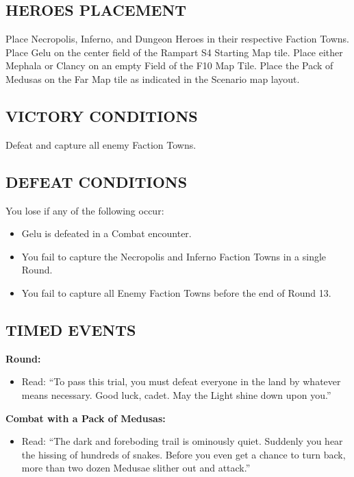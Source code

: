 \begin{multicols*}{2}
\subsection*{\MakeUppercase{Heroes Placement}}

Place Necropolis, Inferno, and Dungeon Heroes in their respective Faction Towns.
Place Gelu on the center field of the Rampart S4 Starting Map tile.
Place either Mephala or Clancy on an empty Field of the F10 Map Tile.
Place the Pack of Medusas on the Far Map tile as indicated in the Scenario map layout.

\subsection*{\MakeUppercase{Victory Conditions}}

Defeat and capture all enemy Faction Towns.

\subsection*{\MakeUppercase{Defeat Conditions}}

You lose if any of the following occur:
\begin{itemize}
  \item Gelu is defeated in a Combat encounter.
  \item You fail to capture the Necropolis and Inferno Faction Towns in a single Round.
  \item You fail to capture all Enemy Faction Towns before the end of Round 13.
\end{itemize}
\subsection*{\MakeUppercase{Timed Events}}

\textbf{ Round:}
\begin{itemize}
  \item Read: ``To pass this trial, you must defeat everyone in the land by whatever means necessary.
    Good luck, cadet.
    May the Light shine down upon you.''
  \end{itemize}

\textbf{Combat with a Pack of Medusas:}
\begin{itemize}
  \item Read: ``The dark and foreboding trail is ominously quiet.
    Suddenly you hear the hissing of hundreds of snakes.
    Before you even get a chance to turn back, more than two dozen Medusae slither out and attack.''
\end{itemize}


\end{multicols*}
